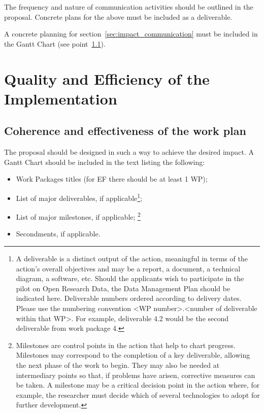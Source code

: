 \medskip\noindent
The frequency and nature of communication activities should be outlined in the proposal. Concrete plans for the above must be included as a deliverable.

\medskip\noindent
A concrete planning for section~\ref{sec:impact_communication} must be included in the Gantt Chart (see point~\ref{sec:implementation_work_plan}).


\newpage
\section{Quality and Efficiency of the Implementation}
\label{sec:implementation}

\subsection{Coherence and effectiveness of the work plan}
\label{sec:implementation_work_plan}

The proposal should be designed in such a way to achieve the desired impact. A Gantt Chart should be included in the text listing the following:

\begin{itemize}
	\item Work Packages titles (for EF there should be at least 1 WP); 
	\item List of major deliverables, if applicable\footnote{A deliverable is a distinct output of the action, meaningful in terms of the action’s overall objectives and may be a report, a document, a technical diagram, a software, etc. Should the applicants wish to participate in the pilot on Open Research Data, the Data Management Plan should be indicated here. 
		Deliverable numbers ordered according to delivery dates. Please use the numbering convention <WP number>.<number of deliverable within that WP>. For example, deliverable 4.2 would be the second deliverable from work package 4.};
	\item List of major milestones, if applicable;%
	\footnote{Milestones are control points in the action that help to chart progress. Milestones may correspond to the completion of a key deliverable, allowing the next phase of the work to begin. They may also be needed at intermediary points so that, if problems have arisen, corrective measures can be taken. A milestone may be a critical decision point in the action where, for example, the researcher must decide which of several technologies to adopt for further development.}
	\item Secondments, if applicable.
\end{itemize}

